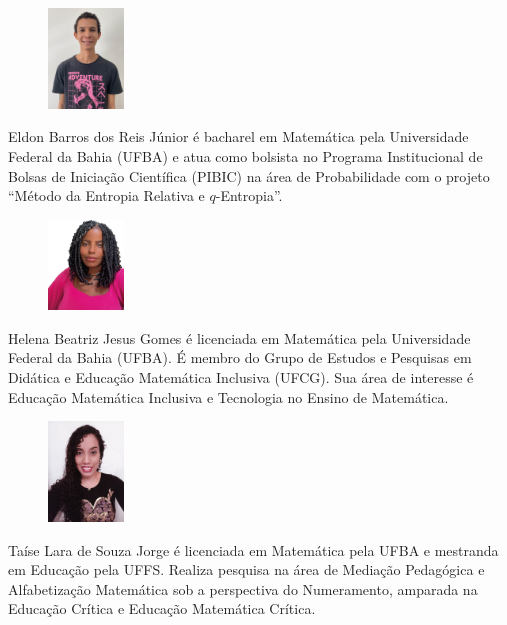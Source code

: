 \documentclass[onecolumn]{hipatia}
\begin{document}
\begin{center}
\begin{minipage}{10cm}
\vspace{0.2cm}
\begin{figure}
	\vspace{-10pt}
	\centering
	\includegraphics[width=2cm]{Eldon.png}
\end{figure}
Eldon Barros dos Reis Júnior é bacharel 
em Matemática pela Universidade Federal da Bahia (UFBA) 
e atua como bolsista no Programa Institucional de 
Bolsas de Iniciação Científica (PIBIC) na área de Probabilidade com o projeto
``Método da Entropia Relativa e $q$-Entropia''.
\end{minipage}
\begin{minipage}{10cm}
	\vspace{0.3cm}
	\begin{figure}
		\vspace{-10pt}
			\includegraphics[width=2cm]{Helena.jpg}
		\end{figure}
		Helena Beatriz Jesus Gomes é licenciada 
		em Matemática pela Universidade Federal da Bahia (UFBA). 
		É membro do Grupo de Estudos e Pesquisas em Didática e Educação Matemática Inclusiva 
		(UFCG). Sua área de interesse é Educação Matemática 
		Inclusiva e Tecnologia no Ensino de Matemática.		
\end{minipage}	
\begin{minipage}{10cm}
	\vspace{0.3cm}
	\begin{figure}
		\vspace{-10pt}
		\centering
		\includegraphics[width=2cm]{Taise.jpg}
	\end{figure}
	Taíse Lara de Souza Jorge é licenciada em Matemática pela UFBA 
	e mestranda em Educação pela UFFS. Realiza pesquisa na área de Mediação
	Pedagógica e Alfabetização Matemática sob a perspectiva do Numeramento, 
	amparada na Educação Crítica e Educação Matemática Crítica. 
\end{minipage}
	
\end{center}
\end{document}
